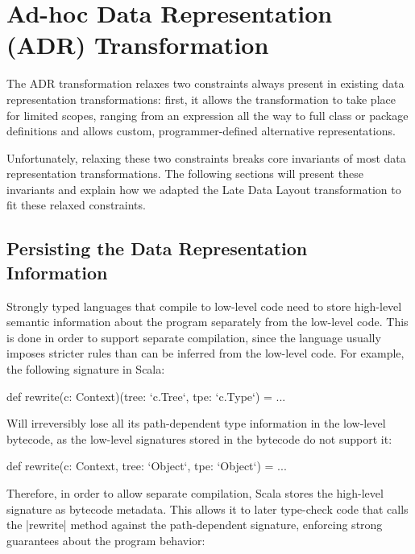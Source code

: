 \section{Ad-hoc Data Representation (ADR) Transformation}
\label{sec:ildl}

The ADR transformation relaxes two constraints always present in existing data representation transformations: first, it allows the transformation to take place for limited scopes, ranging from an expression all the way to full class or package definitions and allows custom, programmer-defined alternative representations.

Unfortunately, relaxing these two constraints breaks core invariants of most data representation transformations. The following sections will present these invariants and explain how we adapted the Late Data Layout transformation to fit these relaxed constraints.

\subsection{Persisting the Data Representation Information}
\label{sec:ildl:signatures}

Strongly typed languages that compile to low-level code need to store high-level semantic information about the program separately from the low-level code. This is done in order to support separate compilation, since the language usually imposes stricter rules than can be inferred from the low-level code. For example, the following signature in Scala:

\begin{lstlisting-nobreak}
def rewrite(c: Context)(tree: `c.Tree`, tpe: `c.Type`) = ...
\end{lstlisting-nobreak}

Will irreversibly lose all its path-dependent type information in the low-level bytecode, as the low-level signatures stored in the bytecode do not support it:

\begin{lstlisting-nobreak}
def rewrite(c: Context, tree: `Object`, tpe: `Object`) = ...
\end{lstlisting-nobreak}

Therefore, in order to allow separate compilation, Scala stores the high-level signature as bytecode metadata. This allows it to later type-check code that calls the |rewrite| method against the path-dependent signature, enforcing strong guarantees about the program behavior:

